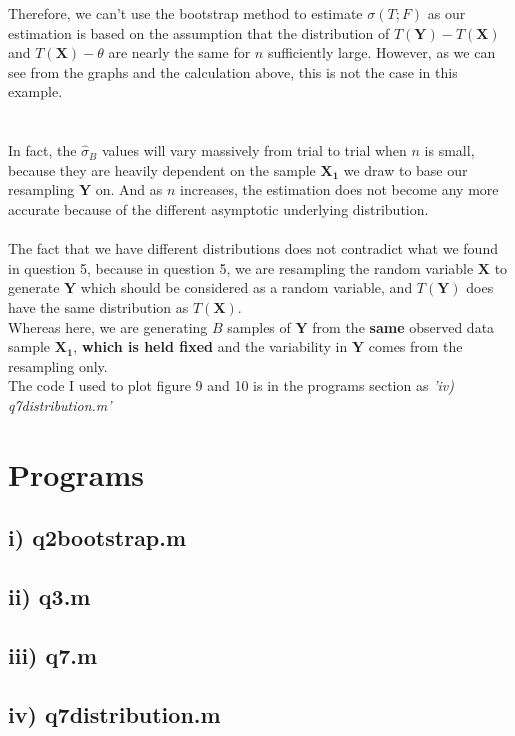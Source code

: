 \documentclass[10pt]{article}
\begin{document}
\noindent Therefore, we can't use the bootstrap method to estimate $\sigma(T;F)$ as our estimation is based on the assumption that the distribution of $T(\mathbf{Y})-T(\mathbf{X})$ and $T(\mathbf{X})-\theta$ are nearly the same for $n$ sufficiently large. However, as we can see from the graphs and the calculation above, this is not the case in this example.\\\\\\
\noindent
In fact, the $\hat{\sigma}_B$ values will vary massively from trial to trial when $n$ is small, because they are heavily dependent on the sample $\mathbf{X_1}$ we draw to base our resampling $\mathbf{Y}$ on. And as $n$ increases, the estimation does not become any more accurate because of the different asymptotic underlying distribution.\\\\
\noindent The fact that we have different distributions does not contradict what we found in question 5, because in question 5, we are resampling the random variable $\mathbf{X}$ to generate $\mathbf{Y}$ which should be considered as a random variable, and $T(\mathbf{Y})$ does have the same distribution as $T(\mathbf{X})$.\\
Whereas here, we are generating $B$ samples of $\mathbf{Y}$ from the \textbf{same} observed data sample $\mathbf{X_1}$, \textbf{which is held fixed} and the variability in $\mathbf{Y}$ comes from the resampling only.\\

\noindent The code I used to plot figure 9 and 10 is in the programs section as \emph{'iv) q7\textunderscore distribution.m'}\\

\newpage
\section*{Programs}
\bigskip
\subsection*{i) q2\textunderscore bootstrap.m}

\subsection*{ii) q3.m}

\subsection*{iii) q7.m}

\subsection*{iv) q7\textunderscore distribution.m}

\end{document}
